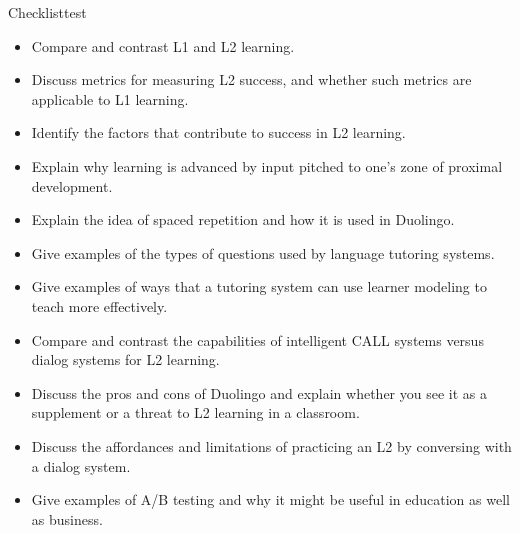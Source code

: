

\begin{tblsfilledsymbol}{Checklist}{test}

\begin{itemize}
\item Compare and contrast L1 and L2 learning.
\item Discuss metrics for measuring L2 success, and whether such metrics are  applicable to L1 learning.
\item Identify the factors that contribute to success in L2 learning.
\item Explain why learning is advanced by input pitched to one's zone of proximal development.
\item Explain the idea of spaced repetition and how it is used in Duolingo.
\item Give examples of the types of questions used by language tutoring systems.
\item Give examples of ways that a tutoring system can use learner modeling to teach more effectively.
\item Compare and contrast the capabilities of intelligent CALL systems versus dialog systems for L2 learning.
\item Discuss the pros and cons of Duolingo and explain whether you see it as a supplement or a threat to L2 learning in a classroom.
\item Discuss the affordances and limitations of practicing an L2 by conversing with a dialog system.
\item Give examples of A/B testing and why it might be useful in education as well as business.
\end{itemize}

\end{tblsfilledsymbol}


